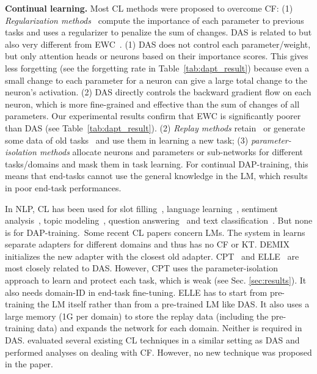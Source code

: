\documentclass{article} \usepackage{iclr2023_conference,times}
\begin{document}
\noindent
\textbf{Continual learning.} 
Most CL methods were proposed to overcome CF: 
(1) \textit{Regularization methods}~\citep{Kirkpatrick2017overcoming,Seff2017continual} compute the importance of each parameter to previous tasks and uses a regularizer to penalize the sum of changes.
DAS is related to but also very different from 
EWC~\citep{Kirkpatrick2017overcoming}. 
(1) DAS does not control each parameter/weight, but only attention heads or neurons based on their importance scores. This gives less forgetting (see the forgetting rate in Table~\ref{tab:dapt_result}) because even a small change to each parameter for a neuron can give a large total change to the neuron's activation. (2) DAS directly controls the backward gradient flow on each neuron, which is more fine-grained and effective than the sum of changes of all parameters. Our experimental results confirm that EWC is significantly poorer than DAS (see Table~\ref{tab:dapt_result}). (2) \textit{Replay methods} retain~\citep{Rebuffi2017,wang2020efficient} or generate some data of old tasks~\citep{Shin2017continual,He2018overcoming} and use them in learning a new task;
(3) \textit{parameter-isolation methods} \citep{Serra2018overcoming,wortsman2020supermasks} allocate neurons and parameters or sub-networks for different tasks/domains and mask them in task learning. For continual DAP-training, this means that end-tasks cannot use the general knowledge in the LM, which results in poor end-task performances.

In NLP, CL has been used for slot filling~\citep{shen-etal-2019-progressive}, language learning~\citep{li2019compositional},
sentiment analysis~\citep{ke2021achieving}, topic modeling~\citep{gupta2020neural}, question answering~\citep{greco2019psycholinguistics} and text classification~\citep{sun2020lamol,huang2021continual,chuang2020lifelong}. But none is for DAP-training.~Some recent CL papers concern LMs. 
The system in \citep{madotto2020continual} learns separate adapters for different domains and thus has no CF or KT. 
DEMIX~\citep{gururangan2021demix} initializes the new adapter with the closest old adapter.  
{\color{black} 
CPT~\citep{ke2022cpt} and ELLE~\citep{DBLP:conf/acl/QinZLL0SZ22} are most closely related to DAS. However, CPT uses the parameter-isolation approach to learn and protect each task, which is weak (see Sec. \ref{sec:results}). It also needs domain-ID in end-task fine-tuning. ELLE has to start from pre-training the LM itself rather than from a pre-trained LM like DAS. It also uses a large memory (1G per domain) to store the replay data (including the pre-training data) and expands the network for each domain. Neither is required in DAS. 
\citet{jin2021lifelong} evaluated several existing CL techniques in a similar setting as DAS and performed analyses on dealing with CF. However, no new technique was proposed in the paper.}
 
\end{document}
